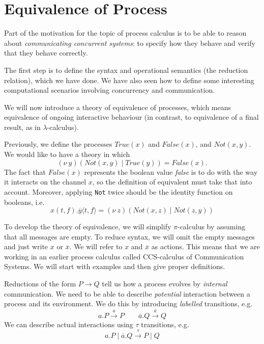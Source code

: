 \documentclass[a4paper, openany]{memoir}
\theoremstyle{definition}
\begin{document}
    \section{Equivalence of Process}
    Part of the motivation for the topic of process calculus is to be able to reason about \emph{communicating concurrent systems}: to specify how they behave and verify that they behave correctly.

    The first step is to define the syntax and operational semantics (the reduction relation), which we have done. We have also seen how to define some interesting computational scenarios involving concurrency and communication.

    We will now introduce a theory of equivalence of processes, which means equivalence of ongoing interactive behaviour (in contrast, to equivalence of a final result, as in $\lambda$-calculus).

    Previously, we define the processes $\textit{True}(x)$ and $\textit{False}(x)$, and $\textit{Not}(x, y)$. We would like to have a theory in which
    \[(\nu \ y)(\textit{Not}(x, y) \mid \textit{True}(y)) = \textit{False}(x).\]
    The fact that $\textit{False}(x)$ represents the boolean value \textit{false} is to do with the way it interacts on the channel $x$, so the definition of equivalent must take that into account. Moreover, applying \texttt{Not} twice should be the identity function on booleans, i.e.
    \[x(t, f).\overline{y} \langle t, f \rangle = (\nu \ z)(\textit{Not}(x, z) \mid \textit{Not}(z, y))\]

    To develop the theory of equivalence, we will simplify $\pi$-calculus by assuming that all messages are empty. To reduce syntax, we will omit the empty messages and just write $x$ or $\overline{x}$. We will refer to $x$ and $\overline{x}$ as actions. This means that we are working in an earlier process calculus called CCS-calculus of Communication Systems. We will start with examples and then give proper definitions.

    Reductions of the form $P \to Q$ tell us how a process evolves by \emph{internal} communication. We need to be able to describe \emph{potential} interaction between a process and its environment. We do this by introducing \emph{labelled} transitions, e.g.
    \[a.P \xrightarrow{a} P \qquad \overline{a}.Q \xrightarrow{\overline{a}} Q\]
    We can describe actual interactions using $\tau$ transitions, e.g.
    \[a.P \mid \overline{a}.Q \xrightarrow{\tau} P \mid Q\]
\end{document}
